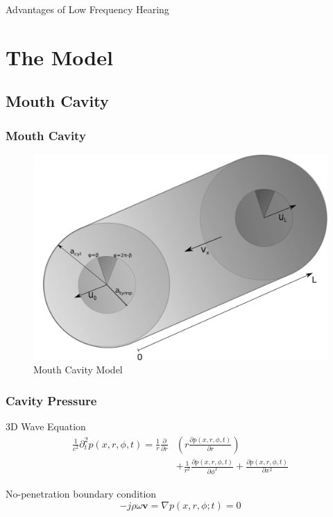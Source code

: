 \documentclass{beamer}
\begin{document}
\begin{frame}
 \begin{exampleblock}{Advantages of Low Frequency Hearing}
  
 \end{exampleblock}

\end{frame}

\section{The Model}

\subsection{Mouth Cavity}
\begin{frame}
\frametitle{Mouth Cavity}
\begin{figure}[htr]
\includegraphics[width=.38\textwidth]{Diagrams/newCylinder.png}
\caption{Mouth Cavity Model}
\end{figure}
\end{frame}

\begin{frame}
\frametitle{Cavity Pressure}
\begin{exampleblock}{3D Wave Equation}
\begin{equation}\label{pressurewaveeqn}
\begin{split}
 \frac{1}{c^2}\partial^2_t p(x,r,\phi,t)=\frac{1}{r}\frac{\partial}{\partial r}&\left(r\frac{\partial p(x,r,\phi,t)}{\partial r}\right)
 \\&+\frac{1}{r^2}\frac{\partial p(x,r,\phi,t)}{\partial \phi^2}
 +\frac{\partial p(x,r,\phi,t)}{\partial x^2}
 \end{split}
\end{equation}
\end{exampleblock}

\begin{block}{No-penetration boundary condition}
\begin{equation}
 -j\rho\omega\mathbf{v}=\nabla p(x,r,\phi;t)=0
\end{equation}
\end{block}

\end{frame}
\end{document}
